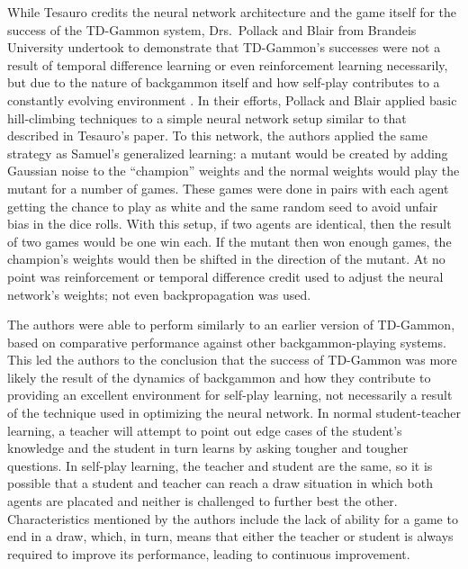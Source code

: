 While Tesauro credits the neural network architecture and the game itself for
the success of the TD-Gammon system,
Drs.\ Pollack and Blair from Brandeis University undertook to demonstrate that
TD-Gammon's successes were not a result of
temporal difference learning
or even reinforcement learning necessarily,
but due to the nature of backgammon itself and how self-play contributes to a
constantly evolving environment
\cite{why-td-gammon}.
%
In their efforts,
Pollack and Blair applied basic hill-climbing techniques to a simple neural
network setup similar to that described in Tesauro's paper.
%
To this network,
the authors applied the same strategy as Samuel's generalized learning:
a mutant would be created by adding Gaussian noise to the ``champion'' weights
and the normal weights would play the mutant for a number of games.
%
These games were done in pairs with each agent getting the chance to play as
white and the same random seed to avoid unfair bias in the dice rolls.
%
With this setup,
if two agents are identical,
then the result of two games would be one win each.
%
If the mutant then won enough games,
the champion's weights would then be shifted in the direction of the mutant.
%
At no point was reinforcement or temporal difference credit used to adjust the
neural network's weights;
not even backpropagation was used.

The authors were able to perform similarly to an earlier version of TD-Gammon,
based on comparative performance against other backgammon-playing systems.
%
This led the authors to the conclusion that the success of TD-Gammon was
more likely
the result of the dynamics of backgammon and how they contribute to providing an
excellent environment for self-play learning,
not necessarily a result of the technique used in optimizing the neural network.
%
In normal student-teacher learning,
a teacher will attempt to point out edge cases of the student's knowledge
and the student in turn learns by asking tougher and tougher questions.
%
In self-play learning,
the teacher and student are the same,
so it is possible that a student and teacher can reach a draw situation in which
both agents are placated and neither is challenged to further best the other.
%
Characteristics mentioned by the authors include the lack of ability for a game
to end in a draw, which, in turn, means that either the teacher or student is
always required to improve its performance,
leading to continuous improvement.

